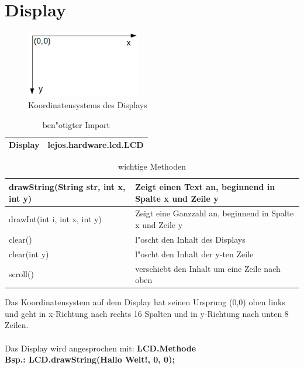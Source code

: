 \section{Display}
	\begin{figure}[h]
		\centering 
		\includegraphics[width=5cm]{images/EV3-CoordSystem.png}
		\caption{Koordinatensystems des Displays}
	\end{figure}
	\begin{table}[h]
		\begin{tabular}{|p{}| p{}|}
			\hline
			Display& lejos.hardware.lcd.LCD
			\\ \hline 
		\end{tabular}
		\caption{ben"otigter Import}
	\end{table}
	
	\begin{table}[H]
		\begin{tabular}{|p{}| p{}|}
			\hline
			drawString(String str, int x, int y)& Zeigt einen Text an, beginnend in Spalte x und Zeile y \\ \hline 
			drawInt(int i, int x, int y) &  Zeigt eine Ganzzahl an, beginnend in Spalte x und Zeile y\\ \hline 
			clear() & l"oscht den Inhalt des Displays\\ \hline
			clear(int y)& l"oscht den Inhalt der y-ten Zeile \\ \hline 
			scroll()& verschiebt den Inhalt um eine Zeile nach oben \\ \hline 
		\end{tabular}
		\caption{wichtige Methoden}
	\end{table}

	Das Koordinatensystem auf dem Display hat seinen Ursprung (0,0) oben links und geht in x-Richtung nach rechts 16 Spalten und in y-Richtung nach unten 8 Zeilen. \\ \\
	Das Display wird angesprochen mit: \textbf{LCD.Methode}\\
	\textbf{Bsp.: LCD.drawString(\glqq Hallo Welt!\grqq{}, 0, 0);}
